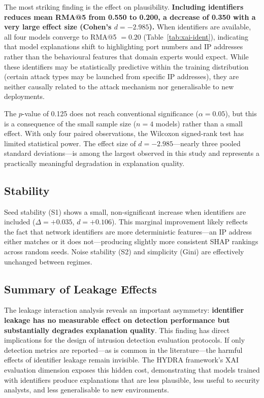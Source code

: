 \documentclass[12pt,a4paper]{report}
\begin{document}
The most striking finding is the effect on plausibility. \textbf{Including identifiers reduces mean RMA@5 from 0.550 to 0.200, a decrease of 0.350 with a very large effect size (Cohen's $d = -2.985$).} When identifiers are available, all four models converge to RMA@5 $= 0.20$ (Table~\ref{tab:xai-ident}), indicating that model explanations shift to highlighting port numbers and IP addresses rather than the behavioural features that domain experts would expect. While these identifiers may be statistically predictive within the training distribution (certain attack types may be launched from specific IP addresses), they are neither causally related to the attack mechanism nor generalisable to new deployments.

The $p$-value of 0.125 does not reach conventional significance ($\alpha = 0.05$), but this is a consequence of the small sample size ($n = 4$ models) rather than a small effect. With only four paired observations, the Wilcoxon signed-rank test has limited statistical power. The effect size of $d = -2.985$---nearly three pooled standard deviations---is among the largest observed in this study and represents a practically meaningful degradation in explanation quality.

\subsection*{Stability}

Seed stability (S1) shows a small, non-significant increase when identifiers are included ($\Delta = +0.035$, $d = +0.106$). This marginal improvement likely reflects the fact that network identifiers are more deterministic features---an IP address either matches or it does not---producing slightly more consistent SHAP rankings across random seeds. Noise stability (S2) and simplicity (Gini) are effectively unchanged between regimes.

\subsection*{Summary of Leakage Effects}

The leakage interaction analysis reveals an important asymmetry: \textbf{identifier leakage has no measurable effect on detection performance but substantially degrades explanation quality}. This finding has direct implications for the design of intrusion detection evaluation protocols. If only detection metrics are reported---as is common in the literature---the harmful effects of identifier leakage remain invisible. The HYDRA framework's XAI evaluation dimension exposes this hidden cost, demonstrating that models trained with identifiers produce explanations that are less plausible, less useful to security analysts, and less generalisable to new environments.
\end{document}
